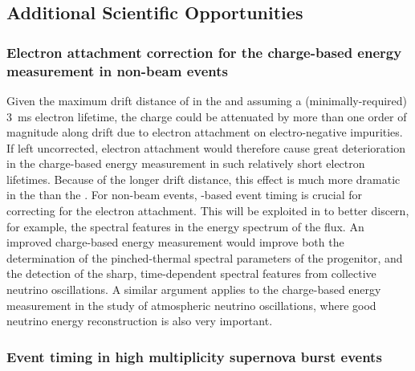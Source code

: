 
\subsection{Additional Scientific Opportunities}
\label{subsec:dp-pds-requirements_opportunities}

\subsubsection{Electron attachment correction for the charge-based energy measurement in non-beam events}
\label{subsubsec:dp-pds-requirements_attachment}

Given the maximum drift distance of \dpmaxdrift in the \dual {} and assuming a (minimally-required) \SI{3}{\ms} electron lifetime, the charge could be attenuated by more than one order of magnitude along drift due to electron attachment on electro-negative impurities. If left uncorrected, electron attachment would therefore cause great deterioration in the charge-based energy measurement in such relatively short electron lifetimes. Because of the longer drift distance, this effect is much more dramatic in the  than the . For non-beam events, -based event timing is crucial for correcting for the electron attachment.
This will be exploited in \dune to better discern, for example, the spectral features in the energy spectrum of the  flux. An improved charge-based energy measurement would improve both the determination of the pinched-thermal spectral parameters of the progenitor, and the detection of the sharp, time-dependent spectral features from collective neutrino oscillations. A similar argument applies to the charge-based energy measurement in the study of atmospheric neutrino oscillations, where good neutrino energy reconstruction is also very important.

\subsubsection{Event timing in high multiplicity supernova burst events}

